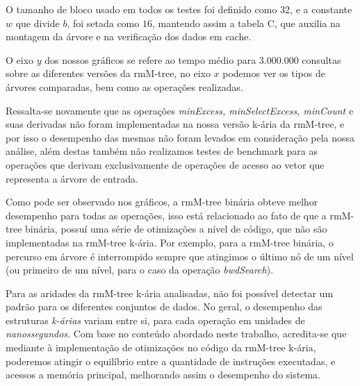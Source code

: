  O tamanho de bloco usado em todos os testes foi definido como $32$, e a constante $w$ que divide $b$, foi setada como $16$, mantendo assim a tabela C, que auxilia na montagem da árvore e na verificação dos dados em cache.

O eixo $y$ dos nossos gráficos se refere ao tempo médio para $3.000.000$ consultas sobre as diferentes versões da rmM-tree, no eixo $x$ podemos ver os tipos de árvores comparadas, bem como as operações realizadas. 

Ressalta-se novamente que as operações \textit{minExcess, minSelectExcess, minCount} e suas derivadas não foram implementadas na nossa versão k-ária da rmM-tree, e por isso o desempenho das mesmas não foram levados em consideração pela nossa análise, além destas também não realizamos testes de benchmark para as operações que derivam exclusivamente de operações de acesso ao vetor que representa a árvore de entrada.

Como pode ser observado nos gráficos, a rmM-tree binária obteve melhor desempenho para todas as operações, isso está relacionado ao fato de que a rmM-tree binária, possuí uma série de otimizações a nível de código, que não são implementadas na rmM-tree k-ária. Por exemplo, para a rmM-tree binária, o percurso em árvore é interrompido sempre que atingimos o último nó de um nível (ou primeiro de um nível, para o caso da operação \textit{bwdSearch}).

Para as aridades da rmM-tree k-ária analisadas, não foi possível detectar um padrão para os diferentes conjuntos de dados. No geral, o desempenho das estruturas \textit{k-árias} variam entre si, para cada operação em unidades de \textit{nanossegundos}. Com base no conteúdo abordado neste trabalho, acredita-se que mediante à implementação de otimizações no código da rmM-tree k-ária, poderemos atingir o equilíbrio entre a quantidade de instruções executadas, e acessos a memória principal, melhorando assim o desempenho do sistema.

\newpage

